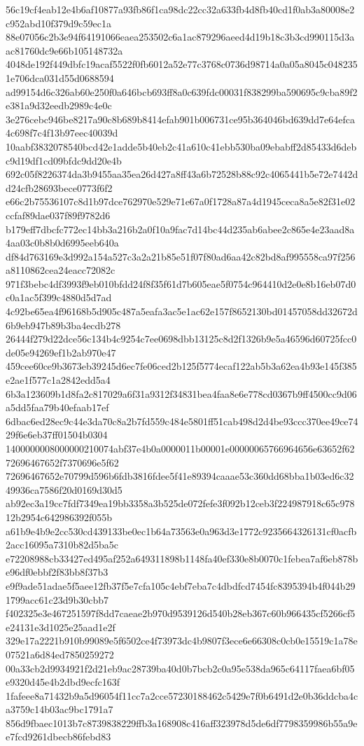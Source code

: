 {56c19cf4eab12e4b6af10877a93fb86f1ca98dc22cc32a633fb4d8fb40cd1f0ab3a80008e2c952abd10f379d9c59ec1a
88e07056c2b3e94f64191066eaea253502c6a1ac879296aeed4d19b18c3b3cd990115d3aac81760dc9e66b105148732a
4048de192f449dbfc19acaf5522f0fb6012a52e77c3768c0736d98714a0a05a8045c0482351e706dca031d55d0688594
ad99154d6c326ab60e250f0a646bcb693ff8a0c639fdc00031f838299ba590695c9cba89f2e381a9d32eedb2989c4e0c
3e276cebc946be8217a90c8b689b8414efab901b006731ce95b364046bd639dd7e64efca4c698f7c4f13b97eec40039d
10aabf3832078540bcd42e1adde5b40eb2c41a610c41ebb530ba09ebabff2d85433d6debc9d19df1cd09bfdc9dd20e4b
692c05f8226374da3b9455aa35ea26d427a8ff43a6b72528b88c92c4065441b5e72e7442dd24cfb28693bece0773f6f2
e66c2b75536107c8d1b97dce762970e529e71e67a0f1728a87a4d1945ceca8a5e82f31e02ccfaf89dae037f89f9782d6
b179eff7dbcfc772ec14bb3a216b2a0f10a9fac7d14bc44d235ab6abee2c865e4e23aad8a4aa03c0b8b0d6995eeb640a
df84d763169e3d992a154a527c3a2a21b85e51f07f80ad6aa42c82bd8af995558ca97f256a8110862cea24eacc72082c
971f3bebc4df3993f9eb010bfdd24f8f35f61d7b605eae5f0754c964410d2e0e8b16eb07d0c0a1ac5f399c4880d5d7ad
4c92be65ea4f96168b5d905c487a5eafa3ac5e1ac62e157f8652130bd01457058dd32672d6b9eb947b89b3ba4ecdb278
26444f279d22dce56c134b4c9254c7ee0698dbb13125c8d2f1326b9e5a46596d60725fcc0de05e94269ef1b2ab970e47
459cee60ce9b3673eb39245d6ec7fe06ced2b125f5774ecaf122ab5b3a62ea4b93e145f385e2ae1f577c1a2842edd5a4
6b3a123609b1d8fa2c817029a6f31a9312f34831bea4faa8e6e778cd0367b9ff4500cc9d06a5dd5faa79b40efaab17ef
6dbac6ed28ec9c44e3da70c8a2b7fd559c484e5801ff51cab498d2d4be93ccc370ee49ce7429f6e6eb37ff01504b0304
1400000008000000210074abf37e4b0a0000011b00001e00000065766964656e63652f6272696467652f7370696e5f62
72696467652e70799d596b6fdb3816fdee5f41e89394caaae53c360dd68bba1b03ed6c3249936ca7586f20d0169d30d5
ab92ec3a19cc7fdf7349ea19bb3358a3b525de072fefe3f092b12ceb3f224987918c65c97812b2954c642986392f055b
a61b9e4b9e2cc530cd439133be0ec1b64a73563e0a963d3e1772c9235664326131cf0acfb2acc16095a7310b82d5ba5c
e72208988cb33427ed495af252a649311898b1148fa40ef330e8b0070c1febea7af6eb878be96df0ebbf2f83bb8f37b3
e9f9ade51adae5f5aee12fb37f5e7cfa105c4ebf7eba7c4dbdfcd7454fc8395394b4f044b291799acc61c23d9b30cbb7
f402325e3e467251597f8dd7caeae2b970d9539126d540b28eb367c60b966435cf5266cf5e24131e3d1025e25aad1e2f
329e17a2221b910b99089e5f6502ce4f73973dc4b9807f3ece6e66308c0cb0e15519c1a78e07521a6d84ed7850259272
00a33cb2d9934921f2d21eb9ac28739ba40d0b7bcb2c0a95e538da965c64117faea6bf05e9320d45e4b2dbd9ecfc163f
1fafeee8a71432b9a5d96054f11cc7a2cce57230188462c5429e7f0b6491d2e0b36ddcba4ca3759c14b03ac9bc1791a7
856d9fbaec1013b7c8739838229ffb3a168908c416aff323978d5de6df7798359986b55a9ee7fcd9261dbecb86febd83
}
